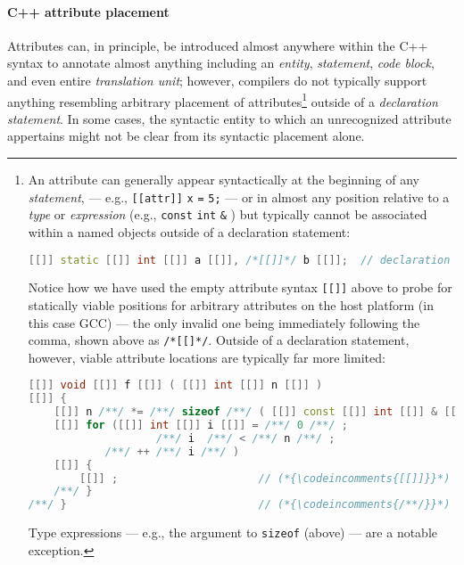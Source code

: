 \documentclass[twoside,10pt,letterpaper,usenames]{newstyle-PearsonGeneric-7-38}
\newcommand{\codeincomments}{\color{skyblue}\ttfamily}
\begin{document}
\paragraph[C++ attribute placement]{C++ attribute placement}\label{c++-attribute-placement}

Attributes can, in principle, be introduced almost anywhere within the
C++ syntax to annotate almost anything including an \emph{entity},
\emph{statement}, \emph{code block}, and even entire \emph{translation
unit}; however, compilers do not typically support anything resembling
arbitrary placement of attributes{\cprotect\footnote{An attribute can
generally appear syntactically at the beginning of any
\emph{statement}, --- e.g., \texttt{[[attr]]} \texttt{x} \texttt{=}
\texttt{5;} --- or in almost any position relative to a \emph{type} or
\emph{expression} (e.g., \texttt{const} \texttt{int} \texttt{\&} ) but
typically cannot be associated within a named objects outside of a
declaration statement:

\begin{lstlisting}[language=C++, basicstyle={\ttfamily\footnotesize}]
[[]] static [[]] int [[]] a [[]], /*[[]]*/ b [[]];  // declaration statement
\end{lstlisting}
    

Notice how we have used the empty attribute syntax \texttt{[[]]} above
to probe for statically viable positions for arbitrary attributes on
the host platform (in this case GCC) --- the only invalid one being
immediately following the comma, shown above as \texttt{/*[[]*/}.
Outside of a declaration statement, however, viable attribute
locations are typically far more limited:

\begin{lstlisting}[language=C++, basicstyle={\ttfamily\footnotesize}]
[[]] void [[]] f [[]] ( [[]] int [[]] n [[]] )
[[]] {
    [[]] n /**/ *= /**/ sizeof /**/ ( [[]] const [[]] int [[]] & [[]] ) /**/;
    [[]] for ([[]] int [[]] i [[]] = /**/ 0 /**/ ;
                    /**/ i  /**/ < /**/ n /**/ ;
            /**/ ++ /**/ i /**/ )
    [[]] {
        [[]] ;                      // (*{\codeincomments{[[]]}}*) denotes viable attribute location
    /**/ }
/**/ }                              // (*{\codeincomments{/**/}}*) denotes no attribute is allowed
\end{lstlisting}
    

Type expressions --- e.g., the argument to \texttt{sizeof} (above) ---
are a notable exception.}} outside of a \emph{declaration statement}.
In some cases, the syntactic entity to which an unrecognized attribute
appertains might not be clear from its syntactic placement alone.
\end{document}
